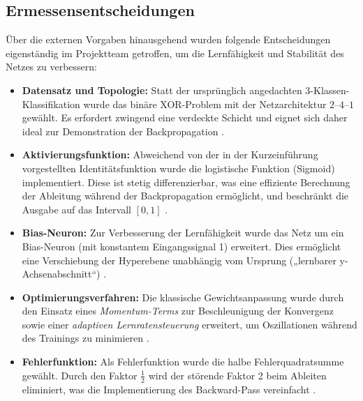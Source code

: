 \subsection{Ermessensentscheidungen}
Über die externen Vorgaben hinausgehend wurden folgende Entscheidungen eigenständig im Projektteam getroffen, um die Lernfähigkeit und Stabilität des Netzes zu verbessern:
\begin{itemize}
	\item \textbf{Datensatz und Topologie:} Statt der ursprünglich angedachten 3-Klassen-Klassifikation wurde das binäre XOR-Problem mit der Netzarchitektur \(2\text{--}4\text{--}1\) gewählt. Es erfordert zwingend eine verdeckte Schicht und eignet sich daher ideal zur Demonstration der Backpropagation \cite{minsky1969perceptrons}.
	\item \textbf{Aktivierungsfunktion:} Abweichend von der in der Kurzeinführung vorgestellten Identitätsfunktion wurde die logistische Funktion (Sigmoid) implementiert. Diese ist stetig differenzierbar, was eine effiziente Berechnung der Ableitung während der Backpropagation ermöglicht, und beschränkt die Ausgabe auf das Intervall \([0,1]\) \cite{vieten_sw01, bishop2006}.
	\item \textbf{Bias-Neuron:} Zur Verbesserung der Lernfähigkeit wurde das Netz um ein Bias-Neuron (mit konstantem Eingangssignal 1) erweitert. Dies ermöglicht eine Verschiebung der Hyperebene unabhängig vom Ursprung („lernbarer y-Achsenabschnitt“) \cite{vieten_sw02}.
	\item \textbf{Optimierungsverfahren:} Die klassische Gewichtsanpassung wurde durch den Einsatz eines \emph{Momentum-Terms} zur Beschleunigung der Konvergenz sowie einer \emph{adaptiven Lernratensteuerung} erweitert, um Oszillationen während des Trainings zu minimieren \cite{aggarwal2023}.
	\item \textbf{Fehlerfunktion:} Als Fehlerfunktion wurde die halbe Fehlerquadratsumme gewählt. Durch den Faktor \(\frac{1}{2}\) wird der störende Faktor 2 beim Ableiten eliminiert, was die Implementierung des Backward-Pass vereinfacht \cite{vieten_sw03, rumelhart1986}.
\end{itemize}
